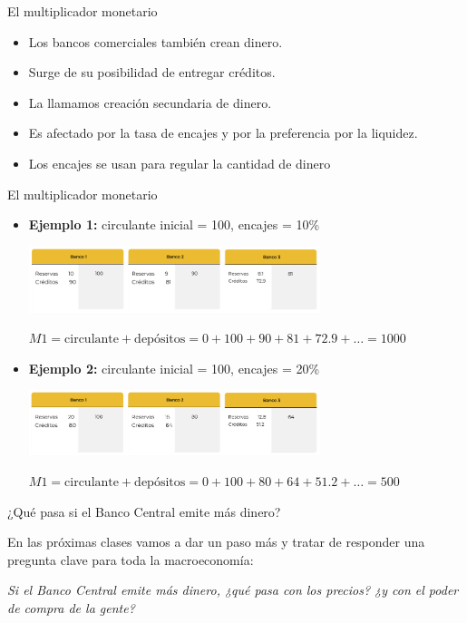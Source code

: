 \documentclass{beamer}
\begin{document}
\begin{frame}{El multiplicador monetario}
    \begin{itemize}
        \item Los bancos comerciales también crean dinero.
        \item Surge de su posibilidad de entregar créditos.
        \item La llamamos creación secundaria de dinero.
        \item Es afectado por la tasa de encajes y por la preferencia por la liquidez.
        \item Los encajes se usan para regular la cantidad de dinero
    \end{itemize}
\end{frame}

\begin{frame}{El multiplicador monetario}
    \begin{itemize}
        \item[\textbullet] \textbf{Ejemplo 1:} circulante inicial = 100, encajes = 10\%
        \begin{center}
            \scriptsize
            \includegraphics[width=8.5cm]{../Figures/C37.15.png}
            
            \vspace{0.3em}
            $M1 = \text{circulante} + \text{depósitos} = 0 + 100 + 90 + 81 + 72.9 + \dots = 1000$
        \end{center}

        \item[\textbullet] \textbf{Ejemplo 2:} circulante inicial = 100, encajes = 20\%
        \begin{center}
            \scriptsize
            \includegraphics[width=8.5cm]{../Figures/C37.16.png}
            
            \vspace{0.3em}
            $M1 = \text{circulante} + \text{depósitos} = 0 + 100 + 80 + 64 + 51.2 + \dots = 500$
        \end{center}
    \end{itemize}
\end{frame}

\begin{frame}{¿Qué pasa si el Banco Central emite más dinero?}
    \begin{boxB}
        \centering
        En las próximas clases vamos a dar un paso más y tratar de responder una pregunta clave para toda la macroeconomía:

        \vspace{0.2em}
        \textit{Si el Banco Central emite más dinero, ¿qué pasa con los precios? ¿y con el poder de compra de la gente?}
    \end{boxB}
\end{frame}
\end{document}
